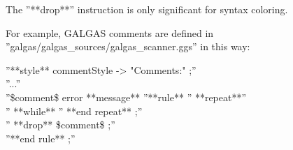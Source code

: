 The ''**drop**'' instruction is only significant for syntax coloring.

For example, GALGAS comments are defined in ''galgas/galgas\_sources/galgas\_scanner.ggs'' in this way:

''**style** commentStyle -> "Comments:" ;''\\
''...''\\
''\$comment\$ error **message** %
''**rule** %
'' **repeat**''\\
'' **while** %
'' **end repeat** ;''\\
'' **drop** \$comment\$ ;''\\
''**end rule** ;''\\
